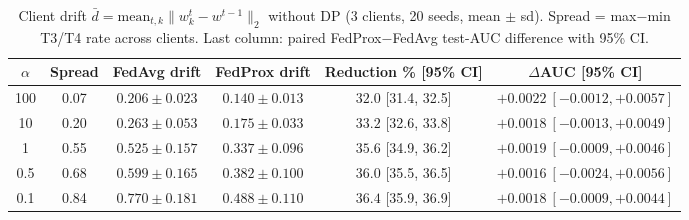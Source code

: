 \begin{table}[t]
\caption{Client drift $\bar d = \mathrm{mean}_{t,k}\|w_k^t - w^{t-1}\|_2$ without DP (3 clients, 20 seeds, mean $\pm$ sd). Spread = max$-$min T3/T4 rate across clients. Last column: paired FedProx$-$FedAvg test-AUC difference with 95\% CI.}
\centering\small
\begin{tabular}{cccccc}
\toprule
$\alpha$ & Spread & FedAvg drift & FedProx drift & Reduction \% [95\% CI] & $\Delta$AUC [95\% CI] \\
\midrule
100 & 0.07 & $0.206 \pm 0.023$ & $0.140 \pm 0.013$ & $32.0$ [31.4, 32.5] & $+0.0022\ [\ensuremath{-}0.0012, +0.0057]$ \\
10 & 0.20 & $0.263 \pm 0.053$ & $0.175 \pm 0.033$ & $33.2$ [32.6, 33.8] & $+0.0018\ [\ensuremath{-}0.0013, +0.0049]$ \\
1 & 0.55 & $0.525 \pm 0.157$ & $0.337 \pm 0.096$ & $35.6$ [34.9, 36.2] & $+0.0019\ [\ensuremath{-}0.0009, +0.0046]$ \\
0.5 & 0.68 & $0.599 \pm 0.165$ & $0.382 \pm 0.100$ & $36.0$ [35.5, 36.5] & $+0.0016\ [\ensuremath{-}0.0024, +0.0056]$ \\
0.1 & 0.84 & $0.770 \pm 0.181$ & $0.488 \pm 0.110$ & $36.4$ [35.9, 36.9] & $+0.0018\ [\ensuremath{-}0.0009, +0.0044]$ \\
\bottomrule
\end{tabular}
\label{tab:drift}
\end{table}
